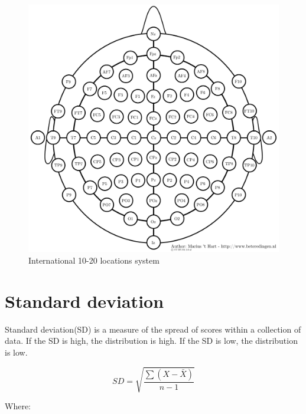 \begin{figure}[ht]
	\centering
	\includegraphics[scale = 0.5]{chapter3/35.pdf}
	\caption{International 10-20 locations system\cite{ref15}}
\end{figure}

\newpage
\section{Standard deviation}
\hspace{1.5cm} Standard deviation(SD) is a measure of the spread of scores within a collection of data. If the SD is high, the distribution is high. If the SD is low, the distribution is low.



\begin{equation}\label{3}
	SD=\sqrt{\frac{\sum {(X-\bar{X})}}{n-1}}
\end{equation}

Where:
%
\begin{itemize}
\end{itemize}


